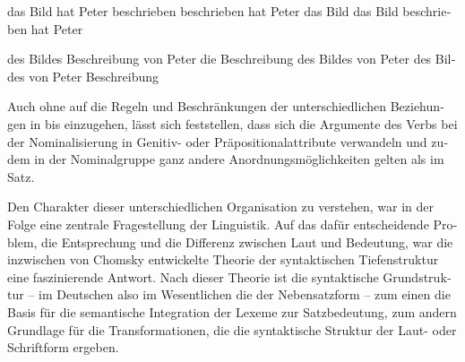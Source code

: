 \documentclass[output=paper,colorlinks,citecolor=brown]{langscibook}
\begin{document}
\begin{otherlanguage}{german}
\ea
\ea das Bild hat Peter beschrieben \label{ex:7a}
\ex beschrieben hat Peter das Bild \label{ex:7b}
\ex das Bild beschrieben hat Peter \label{ex:7c}
\z
\label{ex:7}
\z

\ea
\ea des Bildes Beschreibung von Peter \label{ex:8a} 
\ex die Beschreibung des Bildes von Peter \label{ex:8b}
\ex des Bildes von Peter Beschreibung \label{ex:8c}
\z
\label{ex:8}
\z

\noindent Auch ohne auf die Regeln und Beschränkungen der unterschiedlichen Beziehungen in  bis  einzugehen, lässt sich feststellen, dass sich die Argumente des Verbs bei der Nominalisierung in Genitiv- oder Präpositionalattribute verwandeln und zudem in der Nominalgruppe ganz andere Anordnungsmöglichkeiten gelten als im Satz.

Den Charakter dieser unterschiedlichen Organisation zu verstehen, war in der Folge eine zentrale Fragestellung der Linguistik. Auf das dafür entscheidende Problem, die Entsprechung und die Differenz zwischen Laut und Bedeutung, war die inzwischen von Chomsky entwickelte Theorie der syntaktischen Tiefenstruktur eine faszinierende Antwort. Nach dieser Theorie ist die syntaktische Grundstruktur -- im Deutschen also im Wesentlichen die der Nebensatzform -- zum einen die Basis für die semantische Integration der Lexeme zur Satzbedeutung, zum andern Grundlage für die Transformationen, die die syntaktische Struktur der Laut- oder Schriftform ergeben.


\end{otherlanguage}
\end{document}
